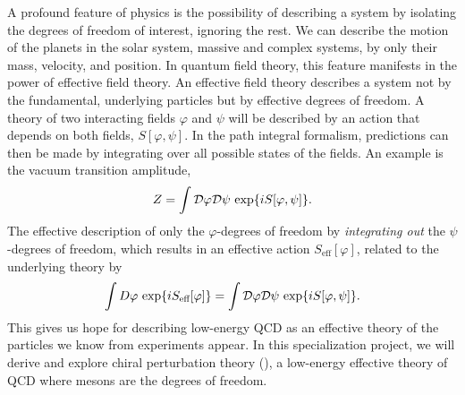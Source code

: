 A profound feature of physics is the possibility of describing a system by isolating the degrees of freedom of interest, ignoring the rest.
We can describe the motion of the planets in the solar system, massive and complex systems, by only their mass, velocity, and position.
In quantum field theory, this feature manifests in the power of effective field theory.
An effective field theory describes a system not by the fundamental, underlying particles but by effective degrees of freedom.
A theory of two interacting fields $\varphi$ and $\psi$ will be described by an action that depends on both fields, $S[\varphi, \psi]$.
In the path integral formalism, predictions can then be made by integrating over all possible states of the fields.
An example is the vacuum transition amplitude,
\begin{equation}
    Z = \int \mathcal{D} \varphi \mathcal{D} \psi \, \exp{i S[\varphi, \psi]}.
\end{equation}
The effective description of only the $\varphi$-degrees of freedom by \emph{integrating out} the $\psi$-degrees of freedom, which results in an effective action $S_\text{eff}[\varphi]$, related to the underlying theory by~\cite{Schwartz:QFT}
\begin{equation}
    \label{integrating out degrees of freedom}
    \int D \varphi \, \exp{i S_\text{eff}[\varphi]}
    =
    \int \mathcal{D} \varphi \mathcal{D} \psi \, \exp{i S[\varphi, \psi]}.
\end{equation}
This gives us hope for describing low-energy QCD as an effective theory of the particles we know from experiments appear.
In this specialization project, we will derive and explore chiral perturbation theory (\chpt), a low-energy effective theory of QCD where mesons are the degrees of freedom.

